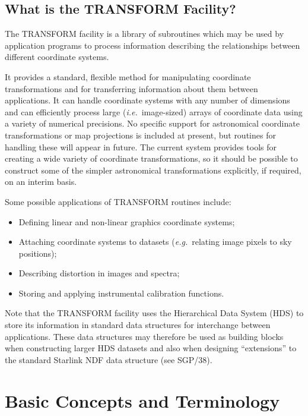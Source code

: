 \documentclass[twoside,11pt]{article}
\newcommand{\xref}[3]{#1}
\newcommand{\xlabel}[1]{}
\renewcommand{\_}{\texttt{\symbol{95}}}
\newcommand{\name}[1]{\mbox{\small{#1}}}
\begin{document}
\subsection{\xlabel{what_is_the_nametransform_facility}What is the \name{TRANSFORM} Facility?}

The \name{TRANSFORM} facility is a library of subroutines which may be used
by application programs to process information describing the relationships
between different coordinate systems.

It provides a standard, flexible method for manipulating coordinate
transformations and for transferring information about them between
applications.
It can handle coordinate systems with any number of dimensions and can
efficiently process large (\emph{i.e.}\ image-sized) arrays of coordinate
data using a variety of numerical precisions.
No specific support for astronomical coordinate transformations or map
projections is included at present, but routines for handling these will
appear in future.
The current system provides tools for creating a wide variety of coordinate
transformations, so it should be possible to construct some of the simpler
astronomical transformations explicitly, if required, on an interim basis.

Some possible applications of \name{TRANSFORM} routines include:

\begin{itemize}
\item Defining linear and non-linear graphics coordinate systems;
\item Attaching coordinate systems to datasets (\emph{e.g.}\ relating image
pixels to sky positions);
\item Describing distortion in images and spectra;
\item Storing and applying instrumental calibration functions.
\end{itemize}

Note that the \name{TRANSFORM} facility uses the Hierarchical Data System
\name{(HDS)} to store its information in standard data structures for
interchange between applications.
These data structures may therefore be used as building blocks when
constructing larger \name{HDS} datasets and also when designing
``extensions'' to the standard Starlink \name{NDF} data structure (see
\xref{SGP/38}{sgp38}{}).

\section{\xlabel{basic_concepts_and_terminology}Basic Concepts and Terminology}
\end{document}

